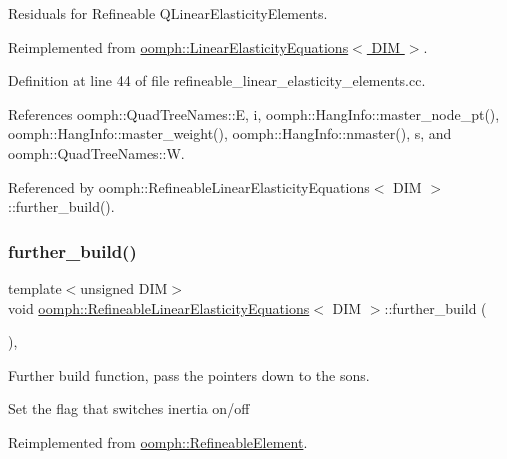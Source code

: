 Residuals for Refineable Q\+Linear\+Elasticity\+Elements. 

Reimplemented from \hyperlink{classoomph_1_1LinearElasticityEquations_aac93dfe3be4fd6debf914a787e87727d}{oomph\+::\+Linear\+Elasticity\+Equations$<$ D\+I\+M $>$}.



Definition at line 44 of file refineable\+\_\+linear\+\_\+elasticity\+\_\+elements.\+cc.



References oomph\+::\+Quad\+Tree\+Names\+::E, i, oomph\+::\+Hang\+Info\+::master\+\_\+node\+\_\+pt(), oomph\+::\+Hang\+Info\+::master\+\_\+weight(), oomph\+::\+Hang\+Info\+::nmaster(), s, and oomph\+::\+Quad\+Tree\+Names\+::W.



Referenced by oomph\+::\+Refineable\+Linear\+Elasticity\+Equations$<$ D\+I\+M $>$\+::further\+\_\+build().

\mbox{\label{classoomph_1_1RefineableLinearElasticityEquations_a59edb90bae16d51048fb8401a91354a3}} 
\subsubsection{\texorpdfstring{further\+\_\+build()}{further\_build()}}
{\footnotesize\ttfamily template$<$unsigned D\+IM$>$ \\
void \hyperlink{classoomph_1_1RefineableLinearElasticityEquations}{oomph\+::\+Refineable\+Linear\+Elasticity\+Equations}$<$ D\+IM $>$\+::further\+\_\+build (\begin{DoxyParamCaption}{ }\end{DoxyParamCaption})\hspace{0.3cm}{\ttfamily [inline]}, {\ttfamily [virtual]}}



Further build function, pass the pointers down to the sons. 

Set the flag that switches inertia on/off 

Reimplemented from \hyperlink{classoomph_1_1RefineableElement_a26628ce36dfad028686adeb4694a9ef3}{oomph\+::\+Refineable\+Element}.



